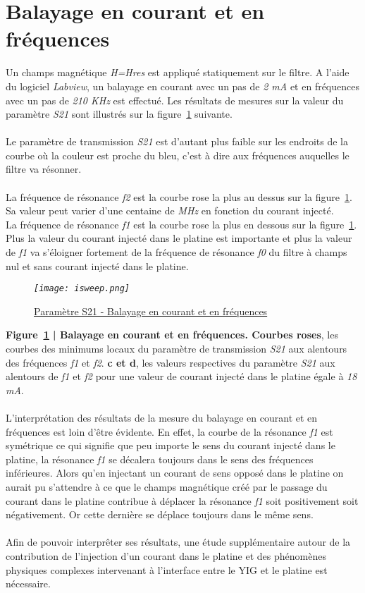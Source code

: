 \documentclass[12pt,fleqn]{book} %
\begin{document}
\section{Balayage en courant et en fréquences}
\noindent Un champs magnétique \emph{H=Hres} est appliqué statiquement sur le filtre. A l'aide du logiciel \emph{Labview}, un balayage en courant avec un pas de \emph{2 mA} et en fréquences avec un pas de \emph{210 KHz} est effectué. Les résultats de mesures sur la valeur du paramètre \emph{S21} sont illustrés sur la figure~\underline{\color{blue}\ref{isweep}} suivante.
~\\\\Le paramètre de transmission \emph{S21} est d'autant plus faible sur les endroits de la courbe où la couleur est proche du bleu, c'est à dire aux fréquences auquelles le filtre va résonner.
~\\\\La fréquence de résonance \emph{f2} est la courbe rose la plus au dessus sur la figure~\underline{\color{blue}\ref{isweep}}. Sa valeur peut varier d'une centaine de \emph{MHz} en fonction du courant injecté.
~\\La fréquence de résonance \emph{f1} est la courbe rose la plus en dessous sur la figure~\underline{\color{blue}\ref{isweep}}. Plus la valeur du courant injecté dans le platine est importante et plus la valeur de \emph{f1} va s'éloigner fortement de la fréquence de résonance \emph{f0} du filtre à champs nul et sans courant injecté dans le platine.
\begin{figure}[H]
	\centering
	\itshape
	\texttt{[image: isweep.png]}
	\caption{\label{isweep} \underline{Paramètre S21 - Balayage en courant et en fréquences}}
\end{figure}
\noindent\footnotesize\textbf{Figure~\underline{\color{blue}\ref{isweep}} | Balayage en courant et en fréquences. Courbes roses}, les courbes des minimums locaux du paramètre de transmission \emph{S21} aux alentours des fréquences \emph{f1} et \emph{f2}. \textbf{c et d}, les valeurs respectives du paramètre \emph{S21} aux alentours de \emph{f1} et  \emph{f2} pour une valeur de courant injecté dans le platine égale à \emph{18 mA}.
\normalsize
~\\\\L'interprétation des résultats de la mesure du balayage en courant et en fréquences est loin d'être évidente. En effet, la courbe de la résonance \emph{f1} est symétrique ce qui signifie que peu importe le sens du courant injecté dans le platine, la résonance \emph{f1} se décalera toujours dans le sens des fréquences inférieures. Alors qu'en injectant un courant de sens opposé dans le platine on aurait pu s'attendre à ce que le champs magnétique créé par le passage du courant dans le platine contribue à déplacer la résonance \emph{f1} soit positivement soit négativement. Or cette dernière se déplace toujours dans le même sens.
~\\\\Afin de pouvoir interprêter ses résultats, une étude supplémentaire autour de la contribution de l'injection d'un courant dans le platine et des phénomènes physiques complexes intervenant à l'interface entre le YIG et le platine est nécessaire.
\end{document}
